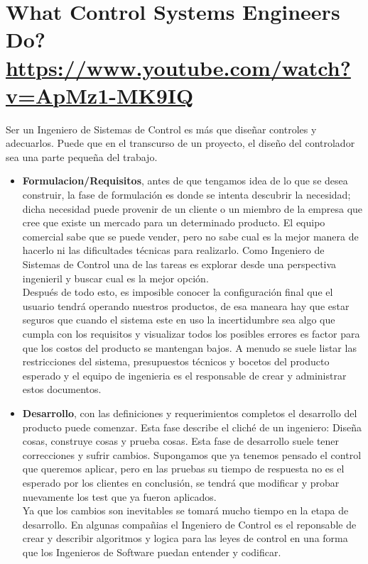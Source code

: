 \documentclass[
	12pt, %
]{fphw}
\begin{document}
\newpage
\section*{{\color{RoyalPurple}What Control Systems Engineers Do?} \url{https://www.youtube.com/watch?v=ApMz1-MK9IQ}}

Ser un Ingeniero de Sistemas de Control es más que diseñar controles y adecuarlos. Puede que en el transcurso de un proyecto, el diseño del controlador sea una parte pequeña del trabajo. 
\begin{itemize}

\item \textbf{Formulacion/Requisitos}, antes de que tengamos idea de lo que se desea construir, la fase de formulación es donde se intenta descubrir la necesidad; dicha necesidad puede provenir de un cliente o un miembro de la empresa que cree que existe un mercado para un determinado producto. El equipo comercial sabe que se puede vender, pero no sabe cual es la mejor manera de hacerlo ni las dificultades técnicas para realizarlo. Como Ingeniero de Sistemas de Control una de las tareas es explorar desde una perspectiva ingenieril y buscar cual es la mejor opción. \\
Después de todo esto, es imposible conocer la configuración final que el usuario tendrá operando nuestros productos, de esa maneara hay que estar seguros que cuando el sistema este en uso la incertidumbre sea algo que cumpla con los requisitos y visualizar todos los posibles errores es factor para que los costos del producto se mantengan bajos. A menudo se suele listar las restricciones del sistema, presupuestos técnicos y bocetos del producto esperado y el equipo de ingenieria es el responsable de crear y administrar estos documentos.

\item \textbf{Desarrollo}, con las definiciones y requerimientos completos el desarrollo del producto puede comenzar. Esta fase describe el cliché de un ingeniero: Diseña cosas, construye cosas y prueba cosas. Esta fase de desarrollo suele tener correcciones y sufrir cambios. Supongamos que ya tenemos pensado el control que queremos aplicar, pero en las pruebas su tiempo de respuesta no es el esperado por los clientes en conclusión, se tendrá que modificar y probar nuevamente los test que ya fueron aplicados.\\

  Ya que los cambios son inevitables se tomará mucho tiempo en la etapa de desarrollo. En algunas compañias el Ingeniero de Control es el reponsable de crear y describir algoritmos y logica para las leyes de control en una forma que los Ingenieros de Software puedan entender y codificar.
  

\end{itemize}
\end{document}
